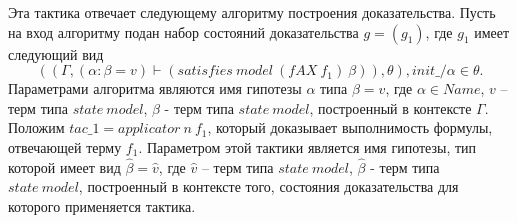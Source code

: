 \documentclass[12pt]{article}
\begin{document}
Эта тактика отвечает следующему алгоритму построения доказательства.
Пусть на вход алгоритму подан набор состояний доказательства $g = (g_1)$, где $g_1$ имеет следующий вид 
$$((\Gamma, (\alpha: \beta = v) \vdash (satisfies\ model\ (fAX\ f_1)\ \beta)), \theta), init\_/\alpha \in \theta.$$ Параметрами алгоритма являются имя гипотезы $\alpha$ типа $\beta = v$, где $\alpha \in Name$, $v$ -- терм типа $state\ model$, $\beta$ - терм типа $state\ model$, построенный в контексте $\Gamma$. Положим $tac\_1 = applicator\ n \ f_1$, который доказывает выполнимость формулы, отвечающей терму $f_1$. Параметром этой тактики является имя гипотезы, тип которой имеет вид $\hat{\beta} = \hat{v}$, где $\hat{v}$ -- терм типа $state\ model$, $\hat{\beta}$ - терм типа $state\ model$, построенный в контексте того, состояния доказательства для которого применяется тактика.
\end{document}
